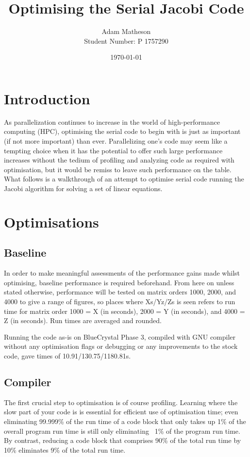 \documentclass{article}
\begin{document}
\title{Optimising the Serial Jacobi Code}
\author{Adam Matheson \\
Student Number: P 1757290}
\date{\today}
\maketitle

\section{Introduction}
As parallelization continues to increase in the world of high-performance computing (HPC), optimising the serial code to begin with is just as important (if not more important) than ever. Parallelizing one's code may seem like a tempting choice when it has the potential to offer such large performance increases without the tedium of profiling and analyzing code as required with optimisation, but it would be remiss to leave such performance on the table. What follows is a walkthrough of an attempt to optimise serial code running the Jacobi algorithm for solving a set of linear equations.

\section{Optimisations}
\subsection{Baseline}
In order to make meaningful assessments of the performance gains made whilst optimising, baseline performance is required beforehand. From here on unless stated otherwise, performance will be tested on matrix orders 1000, 2000, and 4000 to give a range of figures, so places where Xs/Yz/Zs is seen refers to run time for matrix order 1000 = X (in seconds), 2000 = Y (in seconds), and 4000 = Z (in seconds). Run times are averaged and rounded.

Running the code as-is on BlueCrystal Phase 3, compiled with GNU compiler without any optimisation flags or debugging or any improvements to the stock code, gave times of 10.91/130.75/1180.81s.

\subsection{Compiler}
The first crucial step to optimisation is of course profiling. Learning where the slow part of your code is is essential for efficient use of optimisation time; even eliminating 99.999\% of the run time of a code block that only takes up 1\% of the overall program run time is still only eliminating ~1\% of the program run time. By contrast, reducing a code block that comprises 90\% of the total run time by 10\% eliminates 9\% of the total run time.
\end{document}
